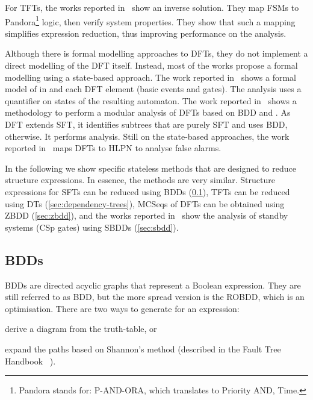 \documentclass[12pt,openright,twoside,a4paper,oldfontcommands,english,brazil,final]{abntex2}
\theoremstyle{theo}
\def\FThandbook{Fault Tree Handbook~\cite{VGR+1981}\index{Fault Tree!Handbook}%
  \gdef\FThandbook{Fault Tree Handbook\index{Fault Tree!Handbook}\xspace}%
  \xspace}
\def\pandora{Pandora\footnote{Pandora stands for: P-AND-ORA, which translates to Priority AND, Time.}%
  \gdef\pandora{Pandora\xspace}%
  \xspace}
\begin{document}
For \acp{TFT}, the works reported in~\cite{MPW2010,MWP2012} show an inverse solution.
They map \acp{FSM} to \pandora logic, then verify system properties.
They show that such a mapping simplifies expression reduction, thus improving performance on the analysis.

Although there is formal modelling approaches to \acp{DFT}, they do not implement a direct modelling of the \ac{DFT} itself.
Instead, most of the works propose a formal modelling using a state-based approach.
The work reported in~\cite{CSD2000} shows a formal model of  in  and each \ac{DFT} element (basic events and gates).
The analysis uses a quantifier on states of the resulting  automaton.
The work reported in~\cite{GD1997} shows a methodology to perform a modular analysis of \acp{DFT} based on \ac{BDD} and .
As \ac{DFT} extends \ac{SFT}, it identifies subtrees that are purely \ac{SFT} and uses \ac{BDD}, otherwise.
It performs  analysis.
Still on the state-based approaches, the work reported in~\cite{SLD2011} maps \acp{DFT} to \ac{HLPN} to analyse false alarms.


In the following we show specific stateless methods that are designed to reduce structure expressions.
In essence, the methods are very similar.
Structure expressions for \acp{SFT} can be reduced using \acp{BDD} (\cref{sec:bdd}), \acp{TFT} can be reduced using \acp{DT} (\cref{sec:dependency-trees}), \acp{MCSeq} of \acp{DFT} can be obtained using \ac{ZBDD} (\cref{sec:zbdd}), and the works reported in~\cite{TXD2011,XTD2012} show the analysis of standby systems (\ac{CSp} gates) using \acp{SBDD} (\cref{sec:sbdd}).

\subsection{\Aclp*{BDD}}
\label{sec:bdd}

\Acp{BDD} are directed acyclic graphs that represent a Boolean expression.
They are still referred to as \ac{BDD}, but the more spread version is the \ac{ROBDD}, which is an optimisation.
There are two ways to generate  for an expression:
\begin{alineasinline}
  \item derive a diagram from the truth-table, or
  \item expand the paths based on Shannon's method (described in the \FThandbook).
\end{alineasinline}
\end{document}
